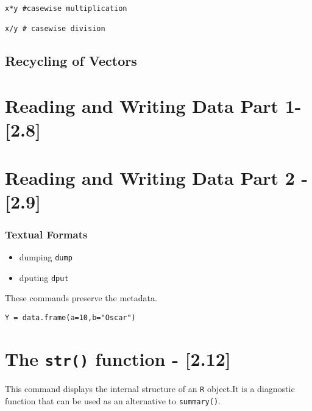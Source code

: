 \documentclass[a4paper,12pt]{article}
\begin{document}
\begin{framed}
\begin{verbatim}
x*y #casewise multiplication

x/y # casewise division
\end{verbatim}
\end{framed}

\subsection*{Recycling of Vectors}

\newpage
\section*{Reading and Writing Data Part 1- [2.8]}

\section*{Reading and Writing Data Part 2 - [2.9]}

\subsubsection{Textual Formats}

\begin{itemize}
\item dumping \texttt{dump} 
\item dputing \texttt{dput}
\end{itemize}

These commands preserve the metadata.

\begin{framed}
\begin{verbatim}
Y = data.frame(a=10,b="Oscar")

\end{verbatim}
\end{framed}

\section*{The \texttt{str()} function - [2.12]}


This command displays the internal structure of an \texttt{R} object.It is a diagnostic function that can be used as an alternative to \texttt{summary()}.
\end{document}
